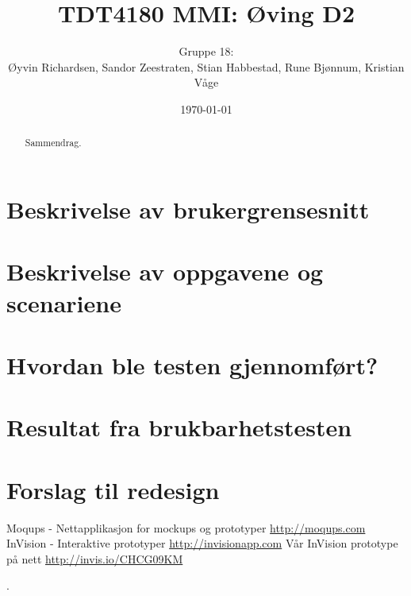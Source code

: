 \documentclass[a4paper,11pt]{article}
\title{TDT4180 MMI: Øving D2}
\author{Gruppe 18: \\ Øyvin Richardsen, Sandor Zeestraten, Stian Habbestad, Rune Bjønnum, Kristian Våge}
\date{\today}
\begin{document}
\maketitle

\begin{abstract}
Sammendrag.
\end{abstract}

\tableofcontents

\newpage

\section{Beskrivelse av brukergrensesnitt}


\section{Beskrivelse av oppgavene og scenariene}


\section{Hvordan ble testen gjennomført?}


\section{Resultat fra brukbarhetstesten}


\section{Forslag til redesign}


\footnotesize{  %
\begin{thebibliography}{N}
 Moqups - Nettapplikasjon for mockups og prototyper \url{http://moqups.com}
 InVision - Interaktive prototyper \url{http://invisionapp.com}
 Vår InVision prototype på nett \url{http://invis.io/CHCG09KM}

\end{thebibliography}.  
}




\end{document}
